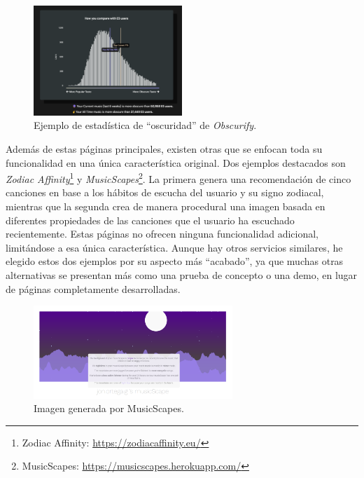 \begin{figure}[htbp]
    \centering
    \includegraphics[width=0.5\textwidth]{figures/obscuify_stat.png}
    \caption{Ejemplo de estadística de ``oscuridad'' de \textit{Obscurify}.}
    \label{fig:obscurify_stat}
\end{figure}

Además de estas páginas principales, existen otras que se enfocan toda su funcionalidad en una única característica original. Dos ejemplos destacados son \textit{Zodiac Affinity}\footnote{Zodiac Affinity: \url{https://zodiacaffinity.eu/}} y \textit{MusicScapes}\footnote{MusicScapes: \url{https://musicscapes.herokuapp.com/}}. La primera genera una recomendación de cinco canciones en base a los hábitos de escucha del usuario y su signo zodiacal, mientras que la segunda crea de manera procedural una imagen basada en diferentes propiedades de las canciones que el usuario ha escuchado recientemente. Estas páginas no ofrecen ninguna funcionalidad adicional, limitándose a esa única característica. Aunque hay otros servicios similares, he elegido estos dos ejemplos por su aspecto más ``acabado'', ya que muchas otras alternativas se presentan más como una prueba de concepto o una demo, en lugar de páginas completamente desarrolladas.

\begin{figure}[htbp]
    \centering
    \includegraphics[width=0.67\textwidth]{figures/music_scapes_ejemplo.png}
    \caption{Imagen generada por MusicScapes.}
    \label{fig:musicscapes_ejemplo}
\end{figure}
